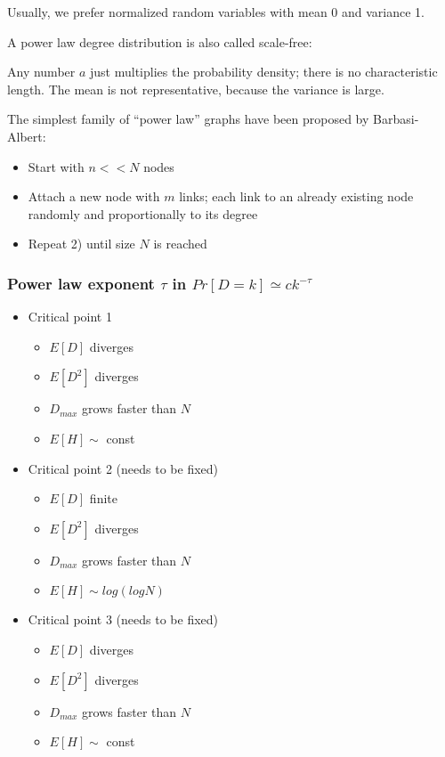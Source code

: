 Usually, we prefer normalized random variables with mean 0 and variance 1.

A power law degree distribution is also called scale-free:

Any number $a$ just multiplies the probability density; there is no characteristic length. 
The mean is not representative, because the variance is large.

The simplest family of ``power law'' graphs have been proposed by Barbasi-Albert:

\begin{itemize}
  \item Start with $n << N$ nodes
  \item Attach a new node with $m$ links; each link to an already existing node 
  randomly and proportionally to its degree
  \item Repeat 2) until size $N$ is reached
\end{itemize}

\subsubsection{Power law exponent $\tau$ in $Pr[D=k] \simeq ck^{-\tau}$}

\begin{itemize}
  \item Critical point 1
  \begin{itemize}
    \item $E[D]$ diverges
    \item $E[D^2]$ diverges
    \item $D_{max}$ grows faster than $N$
    \item $E[H] \sim $ const
  \end{itemize}
  \item Critical point 2 (needs to be fixed)
  \begin{itemize}
    \item $E[D]$ finite
    \item $E[D^2]$ diverges
    \item $D_{max}$ grows faster than $N$
    \item $E[H] \sim log(log N)$
  \end{itemize}
  \item Critical point 3 (needs to be fixed)
  \begin{itemize}
    \item $E[D]$ diverges
    \item $E[D^2]$ diverges
    \item $D_{max}$ grows faster than $N$
    \item $E[H] \sim $ const
  \end{itemize}
\end{itemize}

